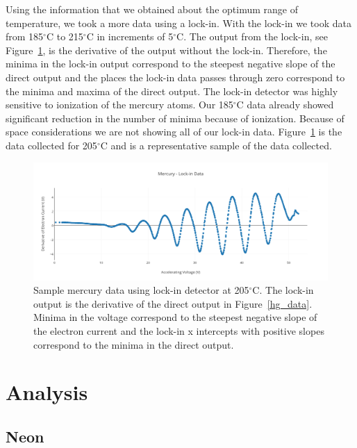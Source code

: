 \documentclass[prb,preprint]{revtex4-1}
\begin{document}
Using the information that we obtained about the optimum range of temperature, we took a more data using a lock-in. With the lock-in we took data from 185$^{\circ}$C to 215$^{\circ}$C in increments of 5$^{\circ}$C. The output from the lock-in, see Figure~\ref{hg_lockin}, is the derivative of the output without the lock-in. Therefore, the minima in the lock-in output correspond to the steepest negative slope of the direct output and the places the lock-in data passes through zero correspond to the minima and maxima of the direct output. The lock-in detector was highly sensitive to ionization of the mercury atoms. Our 185$^{\circ}$C data already showed significant reduction in the number of minima because of ionization. Because of space considerations we are not showing all of our lock-in data. Figure~\ref{hg_lockin} is the data collected for 205$^{\circ}$C and is a representative sample of the data collected.

\begin{figure}[h!]
\centering

\includegraphics[width=6in]{hg_lockin.pdf}
\caption{Sample mercury data using lock-in detector at 205$^{\circ}$C. The lock-in output is the derivative of the direct output in Figure~\ref{hg_data}. Minima in the voltage correspond to the steepest negative slope of the electron current and the lock-in x intercepts with positive slopes correspond to the minima in the direct output.}

\label{hg_lockin}
\end{figure}



\section{Analysis}

\subsection{Neon}
\end{document}
